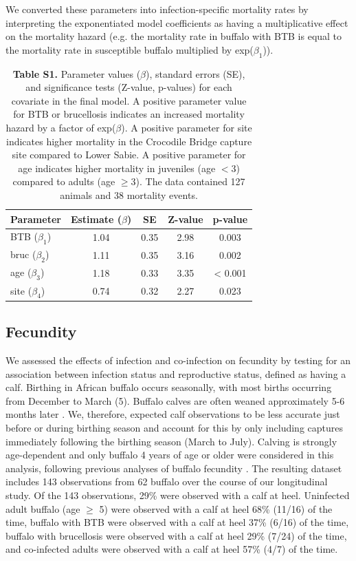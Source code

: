 \documentclass[11pt]{article}
\begin{document}
We converted these parameters into infection-specific mortality rates by interpreting the exponentiated model coefficients as having a multiplicative effect on the mortality hazard (e.g. the mortality rate in buffalo with BTB is equal to the mortality rate in susceptible buffalo multiplied by exp($\beta_1$)). 
\begin{table}[H]
\centering
\caption*{\textbf{Table S1.} Parameter values ($\beta$), standard errors (SE), and significance tests (Z-value, p-values) for each covariate in the final model. A positive parameter value for BTB or brucellosis indicates an increased mortality hazard by a factor of exp($\beta$). A positive parameter for site indicates higher mortality in the Crocodile Bridge capture site compared to Lower Sabie. A positive parameter for age indicates higher mortality in juveniles (age $<3$) compared to adults (age $\geq 3$).  The data contained 127 animals and 38 mortality events.}
\newcommand{\head}[1]{\textnormal{\textbf{#1}}}
\normalsize
\begin{tabular}{lcccc} 
\hline
\head{Parameter     } & \head{     Estimate ($\beta$)     } & \head{     SE     } & \head{     Z-value     } & \head{     p-value     } \\*
\hline
BTB ($\beta_1$) & 1.04 & 0.35 & 2.98 & 0.003 \\
bruc ($\beta_2$)  & 1.11 & 0.35 & 3.16 & 0.002\\
age ($\beta_3$) & 1.18 & 0.33 & 3.35 & < 0.001\\
site ($\beta_4$) & 0.74 & 0.32 & 2.27 & 0.023\\
\hline 
\end{tabular}
\end{table} 
 
\pagebreak 

\subsection*{Fecundity}
We assessed the effects of infection and co-infection on fecundity by testing for an association between infection status and reproductive status, defined as having a calf. Birthing in African buffalo occurs seasonally, with most births occurring from December to March (5). Buffalo calves are often weaned approximately 5-6 months later \cite{winthrop_bovine_1988}. 
We, therefore, expected calf observations to be less accurate just before or during birthing season and account for this by only including captures immediately following the birthing season (March to July). Calving is strongly age-dependent and only buffalo 4 years of age or older were considered in this analysis, following previous analyses of buffalo fecundity \cite{gorsich_context-dependent_2015}. 
The resulting dataset includes 143 observations from 62 buffalo over the course of our longitudinal study. 
Of the 143 observations, 29\% were observed with a calf at heel. 
Uninfected adult buffalo (age $\geq$ 5) were observed with a calf at heel 68\% (11/16) of the time, buffalo with BTB were observed with a calf at heel 37\% (6/16) of the time, buffalo with brucellosis were observed with a calf at heel 29\% (7/24) of the time, and co-infected adults were observed with a calf at heel 57\% (4/7) of the time.
\end{document}
